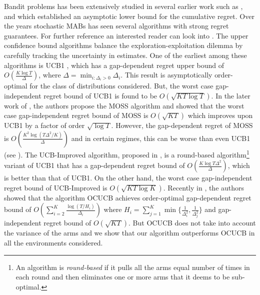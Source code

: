 
	Bandit problems has been extensively studied in several earlier work such as \citet{thompson1933likelihood}, \citet{robbins1952some} and \citet{lai1985asymptotically} which established an asymptotic lower bound for the cumulative regret. Over the years stochastic MABs has seen several algorithms with strong regret guarantees. For  further reference an interested reader can look into \citet{bubeck2012bandits}. The upper confidence bound algorithms balance the exploration-exploitation dilemma by carefully tracking the uncertainty in estimates. One of the earliest among these algorithms is UCB1 \citep{auer2002finite}, which has a gap-dependent regret upper bound of  $O\left(\frac{K\log T}{\Delta}\right)$, where $\Delta = \min_{i:\Delta_i>0} \Delta_i$. This result is asymptotically order-optimal for the class of distributions considered. But, the worst case gap-independent regret bound of UCB1 is found to be  $O \left(\sqrt{KT\log T}\right)$. In the later work of \citet{audibert2009minimax}, the authors propose the MOSS algorithm and showed that the worst case gap-independent regret bound of MOSS is $O\left( \sqrt{KT} \right)$ which improves upon UCB1 by a factor of order $\sqrt{\log T}$. However, the gap-dependent regret of MOSS is $O\left( \frac{K^{2}\log\left(T\Delta^{2}/K\right)}{\Delta}\right)$ and in certain regimes, this can be worse than even UCB1 (see \citet{audibert2009minimax,lattimore2015optimally}). The UCB-Improved algorithm, proposed in \citet{auer2010ucb}, is a round-based algorithm\footnote{An algorithm is \textit{round-based} if it pulls all the arms equal number of times in each round and then eliminates one or more arms that it deems  to be sub-optimal.} variant of UCB1 that 
has a gap-dependent regret bound of $O\left(\frac{K\log T\Delta^{2}}{\Delta}\right)$, which is better than that of UCB1. On the other hand, the worst case gap-independent regret bound of UCB-Improved is $O\left(\sqrt{KT\log K}\right)$. Recently in \citet{lattimore2015optimally}, the authors showed that  the algorithm OCUCB achieves order-optimal gap-dependent regret bound of $O\left(\sum_{i=2}^{K}\frac{\log\left(T/H_i\right)}{\Delta_i}\right)$ where $H_i=\sum_{j=1}^{K}\min\lbrace \frac{1}{\Delta_i^2},\frac{1}{\Delta_j^2}\rbrace$ and gap-independent regret bound of $O\left( \sqrt{KT}\right)$. But OCUCB does not take into account the variance of the arms and we show that our algorithm outperforms OCUCB in all the environments considered. 

